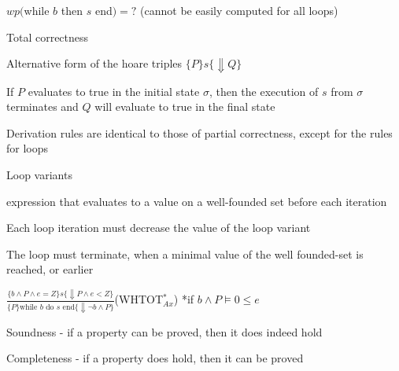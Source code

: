 				\item $wp($while $b$ then $s$ end$) = ?$ (cannot be easily computed for all loops)
			\enumend
		\enumend
	\enumend
	\item Total correctness
	\enumstart
		\item Alternative form of the hoare triples $\{P\}s\{\Downarrow Q\}$
		\item If $P$ evaluates to true in the initial state $\sigma$, then the execution of $s$ from $\sigma$ terminates and $Q$ will evaluate to true in the final state
		\item Derivation rules are identical to those of partial correctness, except for the rules for loops
		\item Loop variants
		\enumstart
			\item expression that evaluates to a value on a well-founded set before each iteration
			\item Each loop iteration must decrease the value of the loop variant
			\item The loop must terminate, when a minimal value of the well founded-set is reached, or earlier
			\item $\frac{\{b \land P \land e = Z\}s\{\Downarrow P \land e < Z\}}{\{P\}\text{while }b\text{ do }s\text{ end}\{\Downarrow \lnot b \land P\}}$(WHTOT$_{Ax}^*$) *if $b \land P \vDash 0 \le e$
		\enumend
	\enumend
	\item Soundness - if a property can be proved, then it does indeed hold
	\item Completeness - if a property does hold, then it can be proved
\enumend
